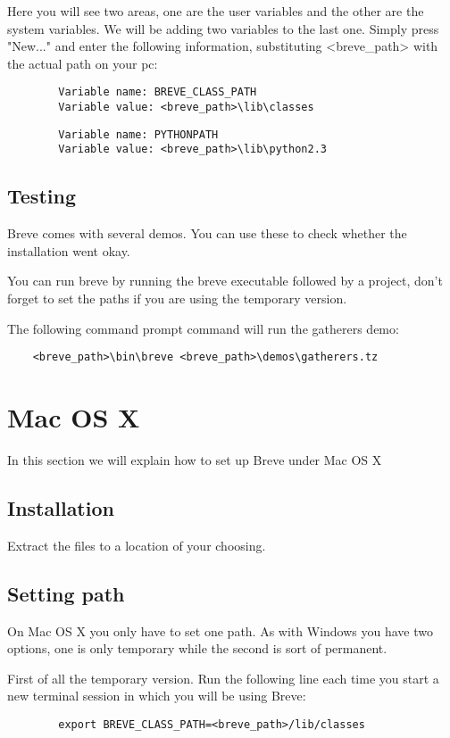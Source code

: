 	Here you will see two areas, one are the user variables and the other are the system variables. We will be adding two variables to the last one. Simply press "New..." and enter the following information, substituting <breve\_path> with the actual path on your pc:
	\begin{lstlisting}
		Variable name: BREVE_CLASS_PATH
		Variable value: <breve_path>\lib\classes
	\end{lstlisting}
	\begin{lstlisting}
		Variable name: PYTHONPATH
		Variable value: <breve_path>\lib\python2.3
	\end{lstlisting}


\subsection{Testing}
	Breve comes with several demos. You can use these to check whether the installation went okay. 

	You can run breve by running the breve executable followed by a project, don't forget to set the paths if you are using the temporary version.

	The following command prompt command will run the gatherers demo:
	\begin{lstlisting}
	<breve_path>\bin\breve <breve_path>\demos\gatherers.tz
	\end{lstlisting}

\section{Mac OS X}
	In this section we will explain how to set up Breve under Mac OS X
\subsection{Installation}
	Extract the files to a location of your choosing.

\subsection{Setting path}
	On Mac OS X you only have to set one path. As with Windows you have two options, one is only temporary while the second is sort of permanent. 

	First of all the temporary version. Run the following line each time you start a new terminal session in which you will be using Breve:
	\begin{lstlisting}
		export BREVE_CLASS_PATH=<breve_path>/lib/classes
	\end{lstlisting}

